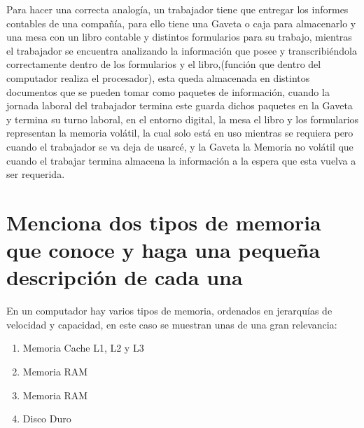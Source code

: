 \documentclass{article}
\begin{document}
	 Para hacer una correcta analogía, un trabajador tiene que entregar los informes contables de una compañía, para ello tiene una Gaveta o caja para almacenarlo y una mesa con un libro contable y distintos formularios para su trabajo, mientras el trabajador se encuentra analizando la información que posee y transcribiéndola correctamente dentro de los formularios y el libro,(función que dentro del computador realiza el procesador), esta queda almacenada en distintos documentos que se pueden tomar como paquetes de información, cuando la jornada laboral del trabajador termina este guarda dichos paquetes en la Gaveta y termina su turno laboral, en el entorno digital, la mesa el libro y los formularios representan la memoria volátil, la cual solo está en uso mientras se requiera pero cuando el trabajador se va deja de usarcé, y la Gaveta la Memoria no volátil que cuando el trabajar termina almacena la información a la espera que esta vuelva a ser requerida.
	 
	\newpage
	
	\section{Menciona dos tipos de memoria que conoce y haga una pequeña descripción de cada una} \label{menciona}
	En un computador hay varios tipos de memoria, ordenados en jerarquías de velocidad y
capacidad, en este caso se muestran unas de una gran relevancia:
	
	\begin{enumerate}
		
		\item Memoria Cache L1, L2 y L3
		\item Memoria RAM
		\item Memoria RAM
		\item Disco Duro
		
	\end{enumerate}
	
\end{document}
